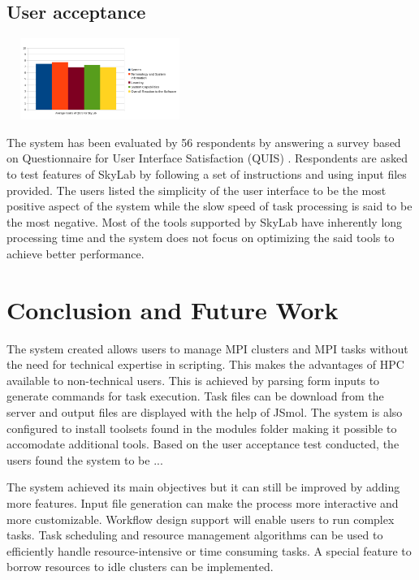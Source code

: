 \documentclass[journal]{./IEEE/IEEEtran}
\begin{document}
	\subsection{User acceptance}
	\begin{center}			
			\includegraphics[width=230px,height=100px]{./images/quis_graph.png}			
	\end{center}
	The system has been evaluated by 56 respondents by answering a survey based on Questionnaire for User Interface Satisfaction (QUIS) \cite{chin1988development}. Respondents are asked to test features of SkyLab by following a set of instructions and using input files provided. The users listed the simplicity of the user interface to be the most positive aspect of the system while the slow speed of task processing is said to be the most negative. Most of the tools supported by SkyLab have inherently long processing time and the system does not focus on optimizing the said tools to achieve better performance. 

	
\section{Conclusion and Future Work}
The system created allows users to manage MPI clusters and MPI tasks without the need for technical expertise in scripting. This makes the advantages of HPC available to non-technical users. This is achieved by parsing form inputs to generate commands for task execution. Task files can be download from the server and output files are displayed with the help of JSmol\cite{IJCH:IJCH201300024}. The system is also configured to install toolsets found in the modules folder making it possible to accomodate additional tools. Based on the user acceptance test conducted, the users found the system to be ... 

The system achieved its main objectives but it can still be improved by adding more features. Input file generation can make the process more interactive and more customizable. Workflow design support will enable users to run complex tasks. Task scheduling and resource management algorithms can be used to efficiently handle resource-intensive or time consuming tasks. A special feature to borrow resources to idle clusters can be implemented. 
\end{document}
